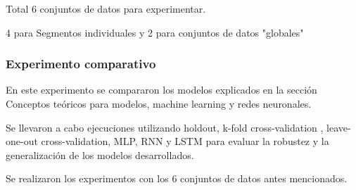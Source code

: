 Total 6 conjuntos de datos para experimentar. 

4 para Segmentos individuales y 2 para conjuntos de datos "globales"


\subsubsection{Experimento comparativo}

En este experimento se compararon los modelos explicados en la sección Conceptos teóricos para modelos, machine learning y redes neuronales.

Se llevaron a cabo ejecuciones utilizando holdout, k-fold cross-validation , leave-one-out cross-validation, MLP, RNN y LSTM para evaluar la robustez y la generalización de los modelos desarrollados.

Se realizaron los experimentos con los 6 conjuntos de datos antes mencionados.







